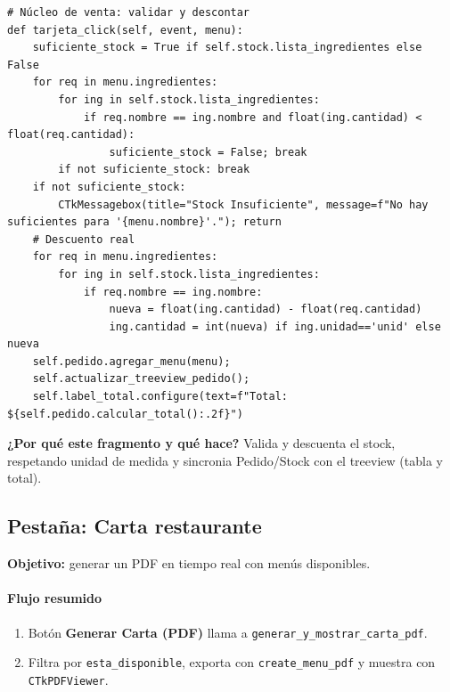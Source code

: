 \documentclass[12pt,a4paper]{article}
\begin{document}
\begin{tcolorbox}[colback=red!6,colframe=red!60!black,title=Highlight de código — Pedido (\texttt{tarjeta\_click})]
\lstset{style=pyclean}
\begin{lstlisting}
# Núcleo de venta: validar y descontar
def tarjeta_click(self, event, menu):
    suficiente_stock = True if self.stock.lista_ingredientes else False
    for req in menu.ingredientes:
        for ing in self.stock.lista_ingredientes:
            if req.nombre == ing.nombre and float(ing.cantidad) < float(req.cantidad):
                suficiente_stock = False; break
        if not suficiente_stock: break
    if not suficiente_stock:
        CTkMessagebox(title="Stock Insuficiente", message=f"No hay suficientes para '{menu.nombre}'."); return
    # Descuento real
    for req in menu.ingredientes:
        for ing in self.stock.lista_ingredientes:
            if req.nombre == ing.nombre:
                nueva = float(ing.cantidad) - float(req.cantidad)
                ing.cantidad = int(nueva) if ing.unidad=='unid' else nueva
    self.pedido.agregar_menu(menu);
    self.actualizar_treeview_pedido();
    self.label_total.configure(text=f"Total: ${self.pedido.calcular_total():.2f}")
\end{lstlisting}
\textbf{¿Por qué este fragmento y qué hace?} Valida y descuenta el stock, respetando unidad de medida y sincronia Pedido/Stock con el treeview (tabla y total).
\end{tcolorbox}
\newpage

\subsection{Pestaña: Carta restaurante}
\textbf{Objetivo:} generar un PDF en tiempo real con menús disponibles.

\paragraph{Flujo resumido}
\begin{enumerate}[leftmargin=*]
  \item Botón \textbf{Generar Carta (PDF)} llama a \texttt{generar\_y\_mostrar\_carta\_pdf}.
  \item Filtra por \texttt{esta\_disponible}, exporta con \texttt{create\_menu\_pdf} y muestra con \texttt{CTkPDFViewer}.
\end{enumerate}
\end{document}
